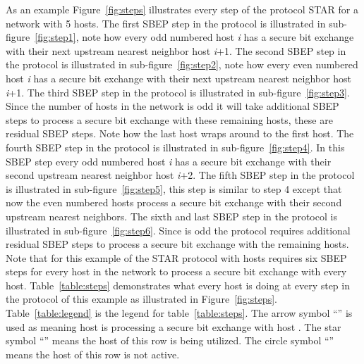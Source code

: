 \documentclass[a4paper,12pt,pdftex]{article}
\begin{document}
As an example Figure~\ref{fig:steps} illustrates every step of the protocol STAR for a network with 5 hosts. The first SBEP step in the protocol is illustrated in sub-figure~\ref{fig:step1}, note how every odd numbered host \textit{i} has a secure bit exchange with their next upstream nearest neighbor host \textit{i}+1. The second SBEP step in the protocol is illustrated in sub-figure~\ref{fig:step2}, note how every even numbered host \textit{i} has a secure bit exchange with their next upstream nearest neighbor host \textit{i}+1. The third SBEP step in the protocol is illustrated in sub-figure~\ref{fig:step3}. Since the number of hosts in the network is odd it will take additional SBEP steps to process a secure bit exchange with these remaining hosts, these are residual SBEP steps. Note how the last host wraps around to the first host. The fourth SBEP step in the protocol is illustrated in sub-figure~\ref{fig:step4}. In this SBEP step every odd numbered host \textit{i} has a secure bit exchange with their second upstream nearest neighbor host \textit{i}+2. The fifth SBEP step in the protocol is illustrated in sub-figure~\ref{fig:step5}, this step is similar to step 4 except that now the even numbered hosts process a secure bit exchange with their second upstream nearest neighbors. The sixth and last SBEP step in the protocol is illustrated in sub-figure~\ref{fig:step6}. Since  is odd the protocol requires additional residual SBEP steps to process a secure bit exchange with the remaining hosts. Note that for this example of the STAR protocol with  hosts requires six SBEP steps for every host in the network to process a secure bit exchange with every host. Table~\ref{table:steps} demonstrates what every host is doing at every step in the protocol of this example as illustrated in Figure~\ref{fig:steps}. Table~\ref{table:legend} is the legend for table~\ref{table:steps}. The arrow symbol ``'' is used as  meaning host  is processing a secure bit exchange with host . The star symbol ``'' means the host of this row is being utilized. The circle symbol ``'' means the host of this row is not active.
\end{document}
